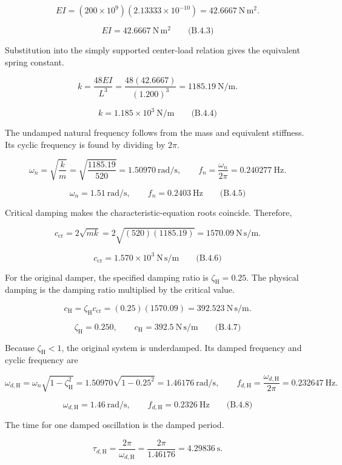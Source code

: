 \[
EI=(200\times10^9)(2.13333\times10^{-10})
 =42.6667\ \mathrm{N\,m^2}.
\]

\[
\boxed{EI=42.6667\ \mathrm{N\,m^2}}
\qquad\text{(B.4.3)}
\]

Substitution into the simply supported center-load relation gives the equivalent spring constant.

\[
k=\frac{48EI}{L^3}
 =\frac{48(42.6667)}{(1.200)^3}
 =1185.19\ \mathrm{N/m}.
\]

\[
\boxed{k=1.185\times10^3\ \mathrm{N/m}}
\qquad\text{(B.4.4)}
\]

The undamped natural frequency follows from the mass and equivalent stiffness. Its cyclic frequency is found by dividing by $2\pi$.

\[
\omega_n=\sqrt{\frac{k}{m}}=\sqrt{\frac{1185.19}{520}}=1.50970\ \mathrm{rad/s},
\qquad
f_n=\frac{\omega_n}{2\pi}=0.240277\ \mathrm{Hz}.
\]

\[
\boxed{\omega_n=1.51\ \mathrm{rad/s},\qquad f_n=0.2403\ \mathrm{Hz}}
\qquad\text{(B.4.5)}
\]

Critical damping makes the characteristic-equation roots coincide. Therefore,

\[
c_{\mathrm{cr}}=2\sqrt{mk}=2\sqrt{(520)(1185.19)}
 =1570.09\ \mathrm{N\,s/m}.
\]

\[
\boxed{c_{\mathrm{cr}}=1.570\times10^3\ \mathrm{N\,s/m}}
\qquad\text{(B.4.6)}
\]

For the original damper, the specified damping ratio is $\zeta_{\mathrm{H}}=0.25$. The physical damping is the damping ratio multiplied by the critical value.

\[
c_{\mathrm{H}}=\zeta_{\mathrm{H}}c_{\mathrm{cr}}
 =(0.25)(1570.09)=392.523\ \mathrm{N\,s/m}.
\]

\[
\boxed{\zeta_{\mathrm{H}}=0.250,\qquad c_{\mathrm{H}}=392.5\ \mathrm{N\,s/m}}
\qquad\text{(B.4.7)}
\]

Because $\zeta_{\mathrm{H}}<1$, the original system is underdamped. Its damped frequency and cyclic frequency are

\[
\omega_{d,\mathrm{H}}=\omega_n\sqrt{1-\zeta_{\mathrm{H}}^2}
 =1.50970\sqrt{1-0.25^2}=1.46176\ \mathrm{rad/s},
\qquad
f_{d,\mathrm{H}}=\frac{\omega_{d,\mathrm{H}}}{2\pi}=0.232647\ \mathrm{Hz}.
\]

\[
\boxed{\omega_{d,\mathrm{H}}=1.46\ \mathrm{rad/s},\qquad f_{d,\mathrm{H}}=0.2326\ \mathrm{Hz}}
\qquad\text{(B.4.8)}
\]

The time for one damped oscillation is the damped period.

\[
\tau_{d,\mathrm{H}}=\frac{2\pi}{\omega_{d,\mathrm{H}}}
 =\frac{2\pi}{1.46176}=4.29836\ \mathrm{s}.
\]

